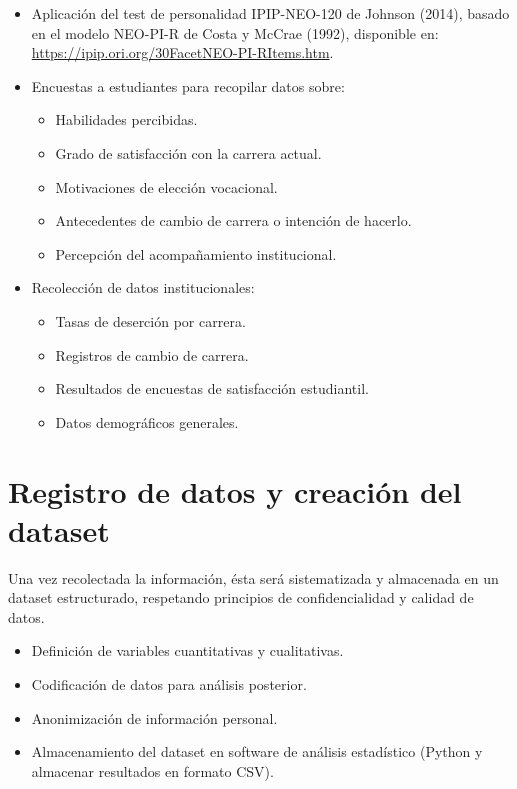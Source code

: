 \begin{itemize}
    \item Aplicación del test de personalidad IPIP-NEO-120 de Johnson (2014), basado en el modelo NEO-PI-R de Costa y McCrae (1992), disponible en: \url{https://ipip.ori.org/30FacetNEO-PI-RItems.htm}.
    \item Encuestas a estudiantes para recopilar datos sobre:
    \begin{itemize}
        \item Habilidades percibidas.
        \item Grado de satisfacción con la carrera actual.
        \item Motivaciones de elección vocacional.
        \item Antecedentes de cambio de carrera o intención de hacerlo.
        \item Percepción del acompañamiento institucional.
    \end{itemize}
    \item Recolección de datos institucionales:
    \begin{itemize}
        \item Tasas de deserción por carrera.
        \item Registros de cambio de carrera.
        \item Resultados de encuestas de satisfacción estudiantil.
        \item Datos demográficos generales.
    \end{itemize}
\end{itemize}

\section{Registro de datos y creación del dataset}

Una vez recolectada la información, ésta será sistematizada y almacenada en un dataset estructurado, respetando principios de confidencialidad y calidad de datos.

\begin{itemize}
    \item Definición de variables cuantitativas y cualitativas.
    \item Codificación de datos para análisis posterior.
    \item Anonimización de información personal.
    \item Almacenamiento del dataset en software de análisis estadístico (Python y almacenar resultados en formato CSV).
\end{itemize}

